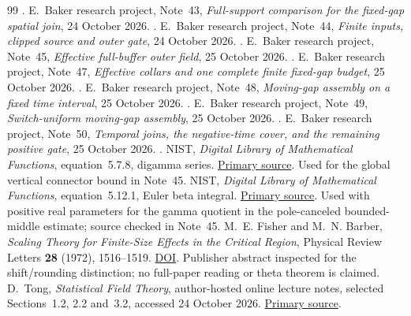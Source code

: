 \begin{thebibliography}{99}
.
E.~Baker research project, Note~43, \emph{Full-support comparison for the
fixed-gap spatial join}, 24 October 2026.
.
E.~Baker research project, Note~44, \emph{Finite inputs, clipped source and
outer gate}, 24 October 2026.
.
E.~Baker research project, Note~45, \emph{Effective full-buffer outer field},
25 October 2026.
.
E.~Baker research project, Note~47, \emph{Effective collars and one complete finite fixed-gap budget},
25 October 2026.
.
E.~Baker research project, Note~48, \emph{Moving-gap assembly on a fixed time interval},
25 October 2026.
.
E.~Baker research project, Note~49, \emph{Switch-uniform moving-gap assembly},
25 October 2026.
.
E.~Baker research project, Note~50, \emph{Temporal joins, the negative-time cover, and the remaining positive gate},
25 October 2026.
.
NIST, \emph{Digital Library of Mathematical Functions}, equation~5.7.8,
digamma series. \href{https://dlmf.nist.gov/5.7.E8}{Primary source}.
Used for the global vertical connector bound in Note~45.
NIST, \emph{Digital Library of Mathematical Functions}, equation~5.12.1,
Euler beta integral. \href{https://dlmf.nist.gov/5.12.E1}{Primary source}.
Used with positive real parameters for the gamma quotient in the
pole-canceled bounded-middle estimate; source checked in Note~45.
M.~E. Fisher and M.~N. Barber, \emph{Scaling Theory for Finite-Size Effects
in the Critical Region}, Physical Review Letters \textbf{28} (1972),
1516--1519. \href{https://doi.org/10.1103/PhysRevLett.28.1516}{DOI}.
Publisher abstract inspected for the shift/rounding distinction; no
full-paper reading or theta theorem is claimed.
D.~Tong, \emph{Statistical Field Theory}, author-hosted online lecture notes,
selected Sections~1.2, 2.2 and~3.2, accessed 24 October 2026.
\href{https://www.damtp.cam.ac.uk/user/tong/sft/}{Primary source}.

\end{thebibliography}
